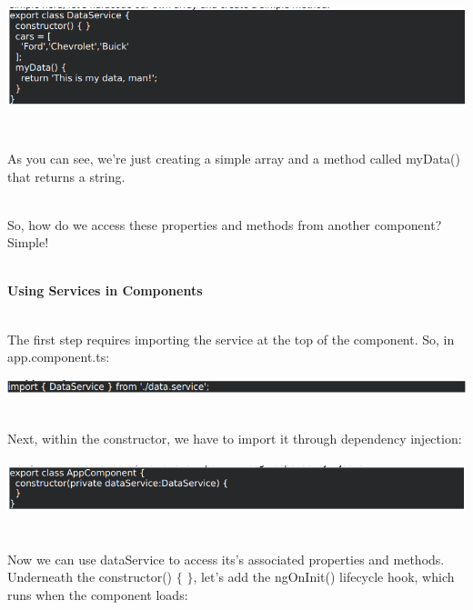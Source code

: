 \documentclass{article}
\begin{document}
\begin{center}
	\noindent \includegraphics*[width=6.26in, height=1.32in, trim=0.00in 0.00in 0.00in 0.05in]{IMG-05-07} 
\end{center}

\noindent 

\noindent \\ As you can see, we're just creating a simple array and a method called myData() that returns a string.

\noindent \\ So, how do we access these properties and methods from another component? Simple!

\noindent \\ \textbf{Using Services in Components}

\noindent 

\noindent \\ The first step requires importing the service at the top of the component. So, in app.component.ts:

\begin{center}
	\noindent \includegraphics*[width=6.23in, height=0.19in]{IMG-05-08}
\end{center}

\noindent \\ Next, within the constructor, we have to import it through dependency injection:

\begin{center}
	\noindent \includegraphics*[width=6.26in, height=0.63in]{IMG-05-09}
\end{center}

\noindent \\ Now we can use dataService to access its's associated properties and methods.
\newpage
\noindent \\ Underneath the constructor() $\mathrm{\{}$ $\mathrm{\}}$, let's add the ngOnInit() lifecycle hook, which runs when the component loads:
\end{document}
